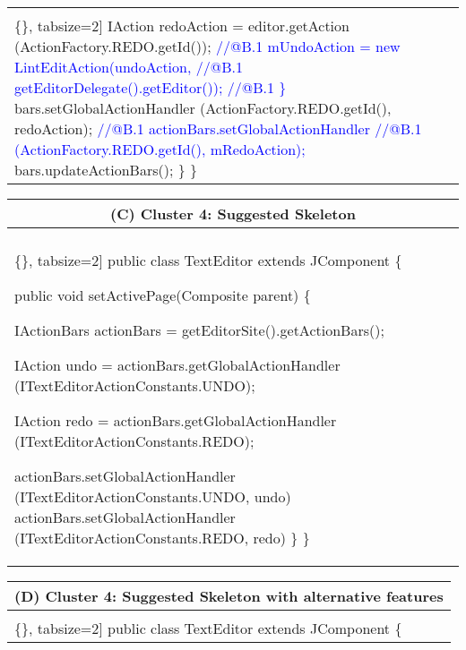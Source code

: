 \begin{figure*}[!htb]
\begin{minipage}{0.5\textwidth}
\begin{tabular}{@{}p{}}
\begin{Verbatim}[commandchars=\\\{\}, tabsize=2]
       IAction redoAction = editor.getAction
          (ActionFactory.REDO.getId());
\textcolor{blue}{//@B.1 mUndoAction = new LintEditAction(undoAction, }
\textcolor{blue}{//@B.1  getEditorDelegate().getEditor());  }
\textcolor{blue}{//@B.1 \}  }             
       bars.setGlobalActionHandler
          (ActionFactory.REDO.getId(), redoAction);
\textcolor{blue}{ //@B.1 actionBars.setGlobalActionHandler}
\textcolor{blue}{//@B.1   (ActionFactory.REDO.getId(), mRedoAction);}
       bars.updateActionBars();
    \}  \}
   \end{Verbatim}
      \vspace{-4mm}
     \\  
\end{tabular} 
\end{minipage}
 \begin{minipage}{0.5\textwidth}
\scriptsize 
\begin{tabular}{@{}p{}} 
 \hline 
  \multicolumn{1}{c}{(C) Cluster 4: Suggested Skeleton} \\ \hline
  \vspace{-4mm}
\begin{Verbatim}[commandchars=\\\{\}, tabsize=2]
public class TextEditor extends JComponent \{

 public void setActivePage(Composite parent) \{

   IActionBars actionBars = getEditorSite().getActionBars();


   IAction undo = actionBars.getGlobalActionHandler
     (ITextEditorActionConstants.UNDO);

     
   IAction redo = actionBars.getGlobalActionHandler
     (ITextEditorActionConstants.REDO);
     
     
   actionBars.setGlobalActionHandler
      (ITextEditorActionConstants.UNDO, undo)
   actionBars.setGlobalActionHandler
      (ITextEditorActionConstants.REDO, redo)     
\} \}
 \end{Verbatim}
      \vspace{-4mm}
  \\      \hline
\end{tabular} 
\end{minipage}
 \begin{minipage}{0.5\textwidth}
\scriptsize 
\begin{tabular}{@{}p{}} 
 \hline 
  \multicolumn{1}{c}{(D) Cluster 4: Suggested Skeleton with alternative features} \\ \hline
  \vspace{-4mm}
\begin{Verbatim}[commandchars=\\\{\}, tabsize=2]
public class TextEditor extends JComponent \{


\end{Verbatim}
\end{tabular}
\end{minipage}
\end{figure*}
